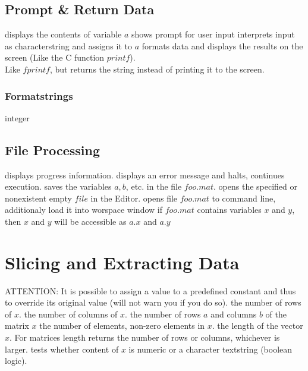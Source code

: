 \subsection{Prompt \& Return Data}{}
	{displays the contents of variable $a$}
	{shows prompt for user input}
	{interprets input as characterstring and assigns it to $a$}
	{formats data and displays the results on
    the screen (Like the C function $printf$).}
\\
	{Like $fprintf$, but returns the string instead of printing it to the screen.}

\subsubsection{Formatstrings}{}
	{integer}

\subsection{File Processing}{}
	{displays progress information.}
	{displays an error message and halts, continues execution.}
	{saves the variables $a, b$, etc. in the file $foo.mat$.}
	{opens the specified or nonexistent empty $file$ in the Editor.}
	{opens file $foo.mat$ to command
    line, additionaly load it into worspace window}
	{if $foo.mat$ contains variables $x$ and $y$, then $x$ and $y$ will be
    accessible as $a.x$ and $a.y$}

\section{Slicing and Extracting Data }{ATTENTION: It is possible to assign
a value to a predefined constant and thus to override its original value
(\ml will not warn you if you do so).}
	{the number of rows of $x$.}
	{the number of columns of $x$.}
	{the number of rows $a$ and columns $b$ of the
    matrix $x$}
	{the number of elements, non-zero elements in $x$.}
	{the length of the vector $x$. For matrices length returns
    the number of rows or columns, whichever is larger.}
	{tests whether content of $x$ is numeric or
    a character textstring (boolean logic).}

